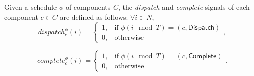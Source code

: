 Given a schedule $\phi$ of components $C$, the \emph{dispatch} and \emph{complete} signals of each component $c \in C$ are defined as follows: $\forall i \in N$,
\begin{equation*}
\label{eqn:dispatch}
    dispatch_c^\phi(i) =
    \begin{cases}
      1, & \text{if } \phi(i \mod T) = (c, \textsf{Dispatch}) \\
      0, & \text{otherwise}
    \end{cases},
\end{equation*}

\begin{equation*}
\label{eqn:complete}
    complete_c^\phi(i) =
    \begin{cases}
      1, & \text{if } \phi(i \mod T) = (c, \textsf{Complete}) \\
      0, & \text{otherwise}
    \end{cases}.
\end{equation*}

